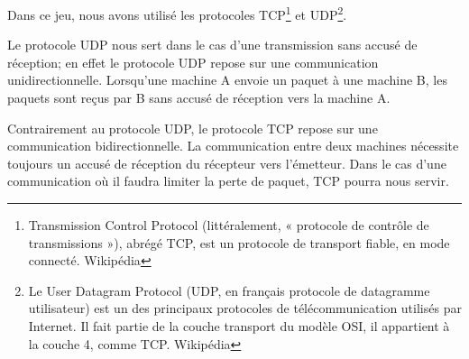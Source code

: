 \par
Dans ce jeu, nous avons utilisé les protocoles TCP\footnote{Transmission Control Protocol (littéralement, « protocole de contrôle de transmissions »), abrégé TCP, est un protocole de transport fiable, en mode connecté. Wikipédia} et UDP\footnote{Le User Datagram Protocol (UDP, en français protocole de datagramme utilisateur) est un des principaux protocoles de télécommunication utilisés par Internet. Il fait partie de la couche transport du modèle OSI, il appartient à la couche 4, comme TCP. Wikipédia}.

\par
Le protocole UDP nous sert dans le cas d'une transmission sans accusé de réception; en effet le protocole UDP repose sur une communication unidirectionnelle. Lorsqu'une machine A envoie un paquet à une machine B, les paquets sont reçus par B sans accusé de réception vers la machine A.

\par
Contrairement au protocole UDP, le protocole TCP repose sur une communication bidirectionnelle. La communication entre deux machines nécessite toujours un accusé de réception du récepteur vers l'émetteur. Dans le cas d'une communication où il faudra limiter la perte de paquet, TCP pourra nous servir. \\
